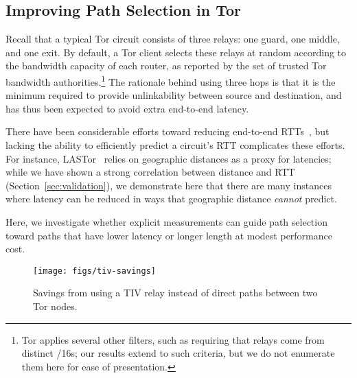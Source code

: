 

\subsection{Improving Path Selection in Tor} %
\label{sec:pathsel}




Recall that a typical Tor circuit consists of three relays: one guard,
one middle, and one exit. 
%
By default, a Tor client selects these relays at random according to
the bandwidth capacity of each router, as reported by the set of
trusted Tor bandwidth authorities.\footnote{Tor applies several other
filters, such as requiring that relays come from distinct /16s; our
results extend to such criteria, but we do not enumerate them here for
ease of presentation.}
%
The rationale behind using three hops is that it is the minimum
required to provide unlinkability between source and destination, and
has thus been expected to avoid extra end-to-end latency.


There have been considerable efforts toward reducing end-to-end
RTTs~\cite{lastor,scalable-relay-selection,path-selection-metrics,tor-performance},
but lacking the ability to efficiently predict a circuit's RTT
complicates these efforts.
%
For instance, LASTor~\cite{lastor} relies on geographic distances as a
proxy for latencies; while we have shown a strong correlation between
distance and RTT (Section~\ref{sec:validation}), we demonstrate here
that there are many instances where latency can be reduced in ways
that geographic distance \emph{cannot} predict.


Here, we investigate whether explicit measurements can guide path
selection toward paths that have lower latency or longer length at
modest performance cost.




\begin{figure}[t!]
\centering
%
\texttt{[image: figs/tiv-savings]}
\caption{\label{fig:tiv-savings} Savings from using a TIV relay instead
of direct paths between two Tor nodes.}
%
\end{figure}

